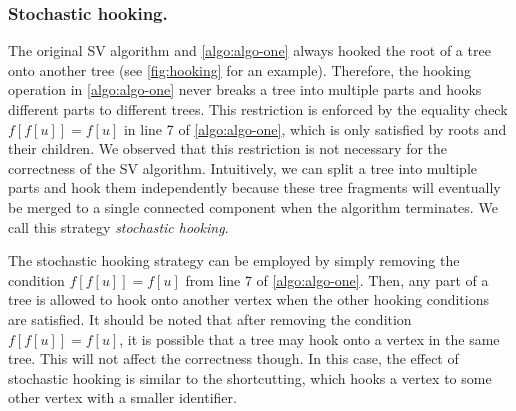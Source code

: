 \documentclass{sokendai_thesis} %
\begin{document}
\subsubsection{Stochastic hooking.}
The original SV algorithm and \autoref{algo:algo-one} always hooked the root of a tree onto another tree (see \autoref{fig:hooking} for an example).
Therefore, the hooking operation in \autoref{algo:algo-one} never breaks a tree into multiple parts and hooks different parts to different trees.
This restriction is enforced by the equality check $f[f[u]]=f[u]$ in line 7 of \autoref{algo:algo-one}, which is only satisfied by roots and their children. 
We observed that this restriction is not necessary for the correctness of the SV algorithm.
Intuitively, we can split a tree into multiple parts and hook them independently because these tree fragments will eventually be merged to a single connected component when the algorithm terminates. 
We call this strategy \emph{stochastic hooking}.





The stochastic hooking strategy can be employed by simply removing the condition $f[f[u]]=f[u]$ from line 7 of \autoref{algo:algo-one}.
Then, any part of a tree is allowed to hook onto another vertex when the other hooking conditions are satisfied. 
It should be noted that after removing the condition $f[f[u]]=f[u]$, it is possible that a tree may hook onto a vertex in the same tree.
This will not affect the correctness though.
In this case, the effect of stochastic hooking is similar to the shortcutting, which hooks a vertex to some other vertex with a smaller identifier.
\end{document}
